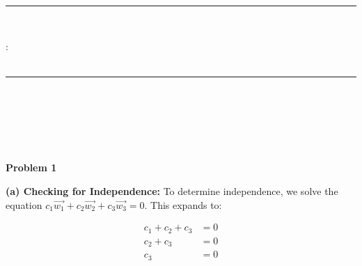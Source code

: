 \documentclass[letterpaper,11pt]{article}
\newcommand{\problem}[1]{
    \vspace{10pt}
    {\color{blue}\textbf{\Large Problem #1}}\\
    \vspace{-5pt}
}
\begin{document}
\BgThispage

\thispagestyle{empty}

\begin{center}
    \textsc{\school} \\
    \textsc{\department} \\\vspace{-5pt}
\end{center}
\rule{\textwidth}{1pt} \\\vspace{-15pt}

\begin{center}
    \coursecode: \coursename \\\vspace{10pt}
    \textbf{\LARGE \assignment} \\\vspace{-5pt}
\end{center}
\rule{\textwidth}{2pt} \\\vspace{-5pt}

\begin{center}
    \large \name \\\vspace{3pt}
    \email \\\vspace{3pt}
    \submissiondate \\\vspace{20pt}
\end{center}

\setlength{\abovedisplayskip}{0pt}
\setlength{\belowdisplayskip}{0pt}


\problem{1}

\textbf{(a) Checking for Independence:}  
To determine independence, we solve the equation $c_1 \vec{w_1} + c_2 \vec{w_2} + c_3 \vec{w_3} = 0$. This expands to:

\begin{align*}
    c_1 + c_2 + c_3 &= 0 \\
    c_2 + c_3 &= 0 \\
    c_3 &= 0 \\
\end{align*}
\end{document}
